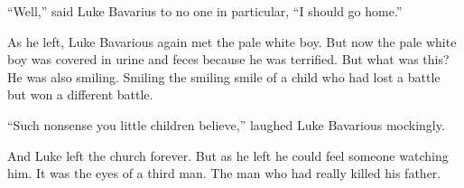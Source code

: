 ``Well,'' said Luke Bavarius to no one in particular,
``I should go home.''



As he left, Luke Bavarious again met the pale white boy. But now
the pale white boy was covered in urine and feces because he was
terrified. But what was this? He was also smiling. Smiling the
smiling smile of a child who had lost a battle but won a different
battle.



``Such nonsense you little children believe,'' laughed
Luke Bavarious mockingly.



And Luke left the church forever. But as he left he could feel
someone watching him. It was the eyes of a third man. The man who
had really killed his father. 
 



